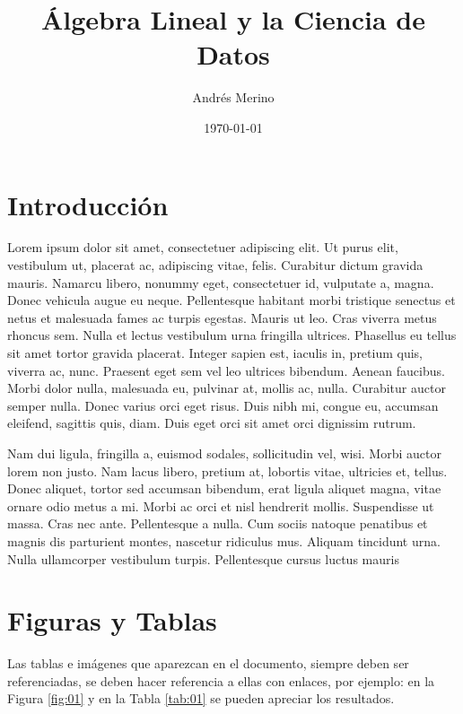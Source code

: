 \documentclass[11pt]{article}
\title{Álgebra Lineal y la Ciencia de Datos}
\author{Andrés Merino}
\affil{Carrera de Ciencia de Datos}
\date{\today}
\begin{document}
\maketitle


\section{Introducción}

Lorem ipsum dolor sit amet, consectetuer adipiscing elit. Ut purus elit, vestibulum ut, placerat ac, adipiscing vitae, felis. Curabitur dictum gravida mauris. Namarcu libero, nonummy eget, consectetuer id, vulputate a, magna. Donec vehicula augue eu neque. Pellentesque habitant morbi tristique senectus et netus et malesuada fames ac turpis egestas. Mauris ut leo. Cras viverra metus rhoncus sem. Nulla et lectus vestibulum urna fringilla ultrices. Phasellus eu tellus sit amet tortor gravida placerat. Integer sapien est, iaculis in, pretium quis, viverra ac, nunc. Praesent eget sem vel leo ultrices bibendum. Aenean faucibus. Morbi dolor nulla, malesuada eu, pulvinar at, mollis ac, nulla. Curabitur auctor semper nulla. Donec varius orci eget risus. Duis nibh mi, congue eu, accumsan eleifend, sagittis quis, diam. Duis eget orci sit amet orci dignissim rutrum.

Nam dui ligula, fringilla a, euismod sodales, sollicitudin vel, wisi. Morbi auctor lorem non justo. Nam lacus libero, pretium at, lobortis vitae, ultricies et, tellus. Donec aliquet, tortor sed accumsan bibendum, erat ligula aliquet magna, vitae ornare odio metus a mi. Morbi ac orci et nisl hendrerit mollis. Suspendisse ut massa. Cras nec ante. Pellentesque a nulla. Cum sociis natoque penatibus et magnis dis parturient montes, nascetur ridiculus mus. Aliquam tincidunt urna. Nulla ullamcorper vestibulum turpis. Pellentesque cursus luctus mauris

\section{Figuras y Tablas}

Las tablas e imágenes que aparezcan en el documento, siempre deben ser referenciadas, se deben hacer referencia a ellas con enlaces, por ejemplo: en la Figura \ref{fig:01} y en la Tabla \ref{tab:01} se pueden apreciar los resultados.
\end{document}

